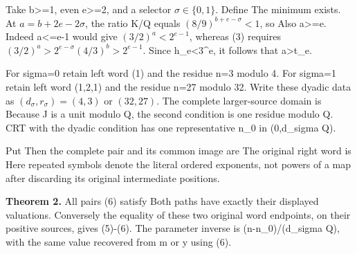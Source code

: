 Take b\textgreater=1, even e\textgreater=2, and a selector
\(\sigma\in\{0,1\}\). Define
 The minimum
exists. At \(a=b+2e-2\sigma\), the ratio K/Q equals
\((8/9)^{b+e-\sigma}<1\), so  Also
a\textgreater=e. Indeed a\textless=e-1 would give \((3/2)^a<2^{e-1}\),
whereas (3) requires \((3/2)^a>2^{e-\sigma}(4/3)^b>2^{e-1}\). Since
h\_e\textless3\^{}e, it follows that a\textgreater t\_e.

For sigma=0 retain left word (1) and the residue n=3 modulo 4. For
sigma=1 retain left word (1,2,1) and the residue n=27 modulo 32. Write
these dyadic data as \((d_\sigma,r_\sigma)=(4,3)\) or \((32,27)\). The
complete larger-source domain is
 Because J is a unit modulo Q, the
second condition is one residue modulo Q. CRT with the dyadic condition
has one representative n\_0 in (0,d\_sigma Q).

Put  Then the complete pair and its common
image are  The original right word is
 Here repeated symbols denote the literal
ordered exponents, not powers of a map after discarding its original
intermediate positions.

\textbf{Theorem 2.} All pairs (6) satisfy
 Both paths have exactly their displayed
valuations. Conversely the equality of these two original word
endpoints, on their positive sources, gives (5)-(6). The parameter
inverse is (n-n\_0)/(d\_sigma Q), with the same value recovered from m
or y using (6).

